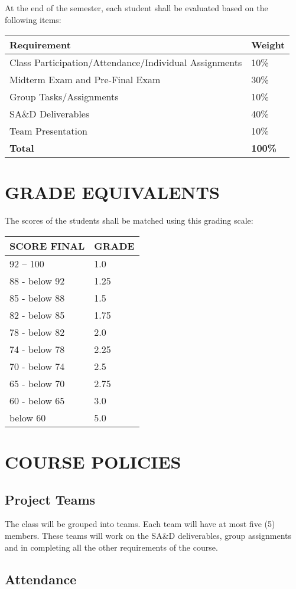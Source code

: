 At the end of the semester, each student shall be evaluated based on the
following items:

\begin{longtable}[]{@{}ll@{}}
\toprule
Requirement & Weight\tabularnewline
\midrule
\endhead
Class Participation/Attendance/Individual Assignments &
10\%\tabularnewline
Midterm Exam and Pre-Final Exam & 30\%\tabularnewline
Group Tasks/Assignments & 10\%\tabularnewline
SA\&D Deliverables & 40\%\tabularnewline
Team Presentation & 10\%\tabularnewline
\textbf{Total} & \textbf{100\%}\tabularnewline
\bottomrule
\end{longtable}

\hypertarget{grade-equivalents}{%
\section{GRADE EQUIVALENTS}\label{grade-equivalents}}

The scores of the students shall be matched using this grading scale:

\begin{longtable}[]{@{}ll@{}}
\toprule
SCORE FINAL & GRADE\tabularnewline
\midrule
\endhead
92 -- 100 & 1.0\tabularnewline
88 - below 92 & 1.25\tabularnewline
85 - below 88 & 1.5\tabularnewline
82 - below 85 & 1.75\tabularnewline
78 - below 82 & 2.0\tabularnewline
74 - below 78 & 2.25\tabularnewline
70 - below 74 & 2.5\tabularnewline
65 - below 70 & 2.75\tabularnewline
60 - below 65 & 3.0\tabularnewline
below 60 & 5.0\tabularnewline
\bottomrule
\end{longtable}

\hypertarget{course-policies}{%
\section{COURSE POLICIES}\label{course-policies}}

\hypertarget{project-teams}{%
\subsection{Project Teams}\label{project-teams}}

The class will be grouped into teams. Each team will have at most five
(5) members. These teams will work on the SA\&D deliverables, group
assignments and in completing all the other requirements of the course.

\hypertarget{attendance}{%
\subsection{Attendance}\label{attendance}}


